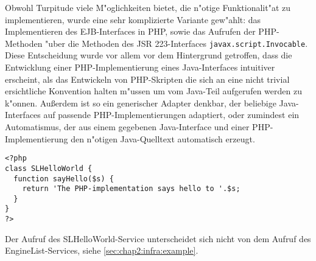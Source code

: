 Obwohl Turpitude viele M"oglichkeiten bietet, die n"otige Funktionalit"at zu implementieren,
wurde eine sehr komplizierte Variante gew"ahlt: das Implementieren des EJB-Interfaces in
PHP, sowie das Aufrufen der PHP-Methoden "uber die Methoden des JSR 223-Interfaces \texttt{javax.script.Invocable}. 
Diese Entscheidung 
wurde vor allem vor dem Hintergrund getroffen, dass die Entwicklung einer PHP-Implementierung eines Java-Interfaces
intuitiver erscheint, als das Entwickeln von PHP-Skripten die sich an eine nicht trivial ersichtliche
Konvention halten m"ussen um vom Java-Teil aufgerufen werden zu k"onnen. Au\ss erdem ist so ein 
generischer Adapter denkbar, der beliebige Java-Interfaces auf passende PHP-Implementierungen adaptiert,
oder zumindest ein Automatismus, der aus einem gegebenen Java-Interface und einer PHP-Implementierung den 
n"otigen Java-Quelltext automatisch erzeugt.

\begin{lstlisting}[caption=PHP-Implementierung]
<?php
class SLHelloWorld {
  function sayHello($s) {
    return 'The PHP-implementation says hello to '.$s;
  }
}
?>
\end{lstlisting}

Der Aufruf des SLHelloWorld-Service unterscheidet sich nicht von dem Aufruf des EngineList-Services, siehe \ref{sec:chap2:infra:example}.


